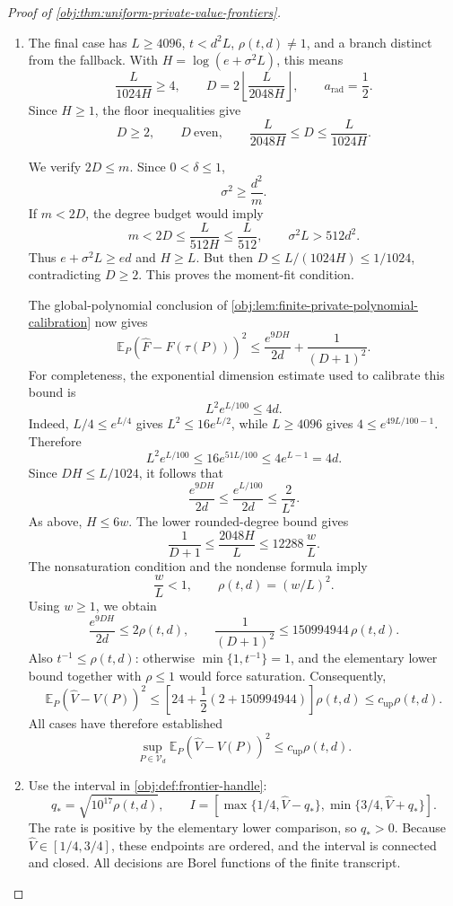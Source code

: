 \begin{proof}[Proof of \cref{obj:thm:uniform-private-value-frontiers}]
\begin{enumerate}
\item
The final case has \(L\ge4096\), \(t<d^2L\), \(\rho(t,d)\ne1\), and a branch distinct from the fallback. With \(H=\log(e+\sigma^2L)\), this means
\[
\frac{L}{1024H}\ge4,
\qquad
D=2\left\lfloor\frac{L}{2048H}\right\rfloor,
\qquad a_{\mathrm{rad}}=\frac12.
\]
Since \(H\ge1\), the floor inequalities give
\[
D\ge2,\qquad D\ \text{even},\qquad
\frac{L}{2048H}\le D\le\frac{L}{1024H}.
\]

We verify \(2D\le m\). Since \(0<\delta\le1\),
\[
\sigma^2\ge\frac{d^2}{m}.
\]
If \(m<2D\), the degree budget would imply
\[
m<2D\le\frac{L}{512H}\le\frac{L}{512},
\qquad
\sigma^2L>512d^2.
\]
Thus \(e+\sigma^2L\ge ed\) and \(H\ge L\). But then
\(D\le L/(1024H)\le1/1024\), contradicting \(D\ge2\).
This proves the moment-fit condition.

The global-polynomial conclusion of
\cref{obj:lem:finite-private-polynomial-calibration} now gives
\[
\mathbb E_P(\widehat F-F(\tau(P)))^2
\le\frac{e^{9DH}}{2d}+\frac1{(D+1)^2}.
\]
For completeness, the exponential dimension estimate used to calibrate this bound is
\[
L^2e^{L/100}\le4d.
\]
Indeed, \(L/4\le e^{L/4}\) gives \(L^2\le16e^{L/2}\), while
\(L\ge4096\) gives \(4\le e^{49L/100-1}\). Therefore
\[
L^2e^{L/100}
\le16e^{51L/100}
\le4e^{L-1}=4d.
\]
Since \(DH\le L/1024\), it follows that
\[
\frac{e^{9DH}}{2d}
\le\frac{e^{L/100}}{2d}\le\frac2{L^2}.
\]
As above, \(H\le6w\). The lower rounded-degree bound gives
\[
\frac1{D+1}\le\frac{2048H}{L}
\le12288\,\frac wL.
\]
The nonsaturation condition and the nondense formula imply
\[
\frac wL<1,\qquad \rho(t,d)=(w/L)^2.
\]
Using \(w\ge1\), we obtain
\[
\frac{e^{9DH}}{2d}\le2\rho(t,d),
\qquad
\frac1{(D+1)^2}\le150994944\,\rho(t,d).
\]
Also \(t^{-1}\le\rho(t,d)\): otherwise
\(\min\{1,t^{-1}\}=1\), and the elementary lower bound together with
\(\rho\le1\) would force saturation. Consequently,
\[
\mathbb E_P(\widehat V-V(P))^2
\le\left[24+\frac12(2+150994944)\right]\rho(t,d)
\le c_{\mathrm{up}}\rho(t,d).
\]
All cases have therefore established
\[
\sup_{P\in\mathcal V_d}
\mathbb E_P(\widehat V-V(P))^2
\le c_{\mathrm{up}}\rho(t,d).
\]

\item
Use the interval in \cref{obj:def:frontier-handle}:
\[
q_*=\sqrt{10^{17}\rho(t,d)},
\qquad
I=
\left[
\max\{1/4,\widehat V-q_*\},
\min\{3/4,\widehat V+q_*\}
\right].
\]
The rate is positive by the elementary lower comparison, so \(q_*>0\).
Because \(\widehat V\in[1/4,3/4]\), these endpoints are ordered, and the interval is connected and closed. All decisions are Borel functions of the finite transcript.


\end{enumerate}
\end{proof}
